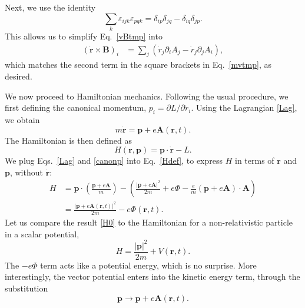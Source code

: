 \documentclass[prx,12pt]{revtex4-2}
\begin{document}
Next, we use the identity
\begin{equation}
  \sum_k \varepsilon_{ijk} \varepsilon_{pqk}
  = \delta_{ip} \delta_{jq} - \delta_{iq} \delta_{jp}.
\end{equation}
This allows us to simplify Eq.~\eqref{vBtmp} into
\begin{align}
  (\dot{\mathbf{r}} \times \mathbf{B})_i
  &= \sum_{j} \left( \dot{r}_j  \partial_i A_j - \dot{r}_j  \partial_j A_i\right),
\end{align}
which matches the second term in the square brackets in
Eq.~\eqref{mvtmp}, as desired.

We now proceed to Hamiltonian mechanics.  Following the usual
procedure, we first defining the canonical momentum, $p_i = \partial
L/\partial \dot{r}_i$.  Using the Lagrangian \eqref{Lag}, we obtain
\begin{equation}
  m \dot{\mathbf{r}} = \mathbf{p} + e \mathbf{A}(\mathbf{r},t).
  \label{canonp}
\end{equation}
The Hamiltonian is then defined as
\begin{equation}
  H(\mathbf{r},\mathbf{p}) = \mathbf{p} \cdot \dot{\mathbf{r}} - L.
  \label{Hdef}
\end{equation}
We plug Eqs.~\eqref{Lag} and \eqref{canonp} into Eq.~\eqref{Hdef}, to
express $H$ in terms of $\mathbf{r}$ and $\mathbf{p}$, without
$\dot{\mathbf{r}}$:
\begin{align}
  H &= \mathbf{p}\cdot \left(\frac{\mathbf{p}+e\mathbf{A}}{m}\right)
  - \left(\frac{|\mathbf{p}+e\mathbf{A}|^2}{2m}
  + e\Phi - \frac{e}{m}(\mathbf{p}+e\mathbf{A})\cdot \mathbf{A}\right) \\
  &= \frac{|\mathbf{p}+e\mathbf{A}(\mathbf{r},t)|^2}{2m} - e\Phi(\mathbf{r},t).
  \label{H0}
\end{align}
Let us compare the result \eqref{H0} to the Hamiltonian for a
non-relativistic particle in a scalar potential,
\begin{equation*}
  H = \frac{|\mathbf{p}|^2}{2m} + V(\mathbf{r},t).
\end{equation*}
The $-e\Phi$ term acts like a potential energy, which is no surprise.
More interestingly, the vector potential enters into the kinetic
energy term, through the substitution
\begin{equation}
  \mathbf{p} \rightarrow \mathbf{p} + e\mathbf{A}(\mathbf{r},t).  
\end{equation}
\end{document}

